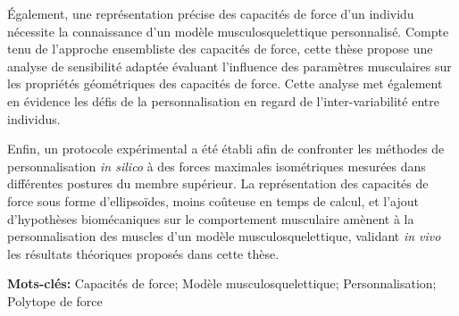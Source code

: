 Également, une représentation précise des capacités de force d'un individu nécessite la connaissance d'un modèle musculosquelettique personnalisé. Compte tenu de l'approche ensembliste des capacités de force, cette thèse propose une analyse de sensibilité adaptée évaluant l'influence des paramètres musculaires sur les propriétés géométriques des capacités de force. Cette analyse met également en évidence les défis de la personnalisation en regard de l'inter-variabilité entre individus.

Enfin, un protocole expérimental a été établi afin de confronter les méthodes de personnalisation \emph{in silico} à des forces maximales isométriques mesurées dans différentes postures du membre supérieur. La représentation des capacités de force sous forme d'ellipsoïdes, moins coûteuse en temps de calcul, et l'ajout d'hypothèses biomécaniques sur le comportement musculaire amènent à la personnalisation des muscles d'un modèle musculosquelettique, validant \emph{in vivo} les résultats théoriques proposés dans cette thèse.

\textbf{Mots-clés:} Capacités de force; Modèle musculosquelettique; Personnalisation; Polytope de force